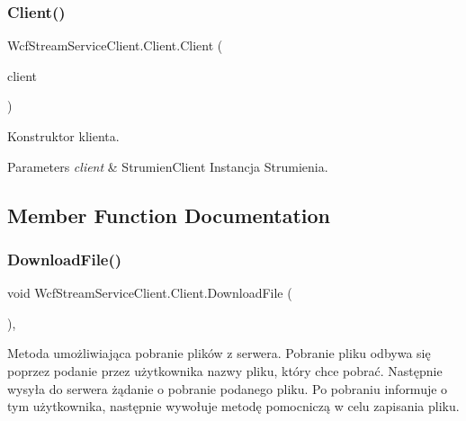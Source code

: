 \subsubsection{\texorpdfstring{Client()}{Client()}}
{\footnotesize\ttfamily Wcf\+Stream\+Service\+Client.\+Client.\+Client (\begin{DoxyParamCaption}\item[{\hyperlink{class_wcf_stream_service_client_1_1_service_reference1_1_1_strumien_client}{Strumien\+Client}}]{client }\end{DoxyParamCaption})\hspace{0.3cm}{\ttfamily [inline]}}



Konstruktor klienta. 


\begin{DoxyParams}{Parameters}
{\em client} & Strumien\+Client Instancja Strumienia.\\
\hline
\end{DoxyParams}


\subsection{Member Function Documentation}
\mbox{\label{class_wcf_stream_service_client_1_1_client_a8344bf9cc6cdb22a11d6f86240d7ed3d}} 
\subsubsection{\texorpdfstring{Download\+File()}{DownloadFile()}}
{\footnotesize\ttfamily void Wcf\+Stream\+Service\+Client.\+Client.\+Download\+File (\begin{DoxyParamCaption}{ }\end{DoxyParamCaption})\hspace{0.3cm}{\ttfamily [inline]}, {\ttfamily [private]}}



Metoda umożliwiająca pobranie plików z serwera. Pobranie pliku odbywa się poprzez podanie przez użytkownika nazwy pliku, który chce pobrać. Następnie wysyła do serwera żądanie o pobranie podanego pliku. Po pobraniu informuje o tym użytkownika, następnie wywołuje metodę pomocniczą w celu zapisania pliku. 

